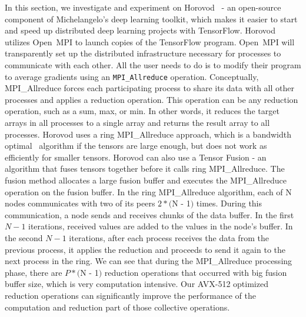 \documentclass[5p,times,twocolumn]{elsarticle}
\newcommand{\mpifunc}[1]{\lstinline"MPI_#1"\xspace}
\newcommand{\ompi}[0]{Open~MPI\xspace}
\newcommand{\allreduce}[0]{MPI_Allreduce\xspace}
\begin{document}
In this section, we investigate and experiment on Horovod~\cite{sergeev2018horovod} - an
open-source component of Michelangelo's deep learning toolkit, which makes it easier to start and
speed up distributed deep learning projects with TensorFlow.
%
Horovod utilizes \ompi to launch copies of the TensorFlow program. \ompi will transparently set up the distributed infrastructure necessary for processes to communicate with each other. All the user needs to do is to
modify their program to average gradients using an \mpifunc{Allreduce} operation.
%
Conceptually, \allreduce forces each participating process to share its data with all other processes and applies a reduction operation.
This operation can be any reduction operation, such as a sum, max, or min.
In other words, it reduces the target arrays in all processes
to a single array and returns the result array to all processes.
%
Horovod uses a ring \allreduce approach, which is a bandwidth optimal~\cite{allreduce-optimal} algorithm if the tensors are large enough, but does not
work as efficiently for smaller tensors.
Horovod can also use a Tensor Fusion - an algorithm that fuses tensors together
before it calls ring \allreduce. The fusion method allocates a large fusion buffer and executes the
\allreduce operation on the fusion buffer.
%
In the ring \allreduce algorithm, each of N nodes communicates with two of its
peers $2 * ($N - 1$)$ times. During this communication, a node sends and receives chunks of the data
buffer. In the first $N - 1$ iterations, received values are added to the values in the node's buffer. In
the second $N - 1$ iterations, after each process receives the data from the previous process, it
applies the reduction and proceeds to send it again to the next process in the ring.
%
We can see that during the \allreduce processing phase, there are $P * ($N - 1$)$ reduction operations
that occurred with big fusion buffer size, which is very computation intensive.
Our AVX-512 optimized reduction operations can significantly improve the performance
of the computation and reduction part of those collective operations.
\end{document}

